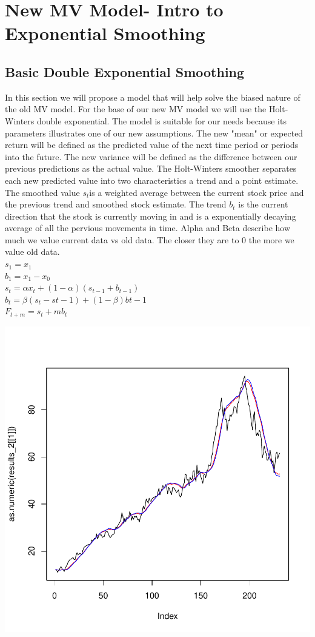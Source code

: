 \documentclass[english]{report}
\begin{document}
\newpage
\section{New MV Model- Intro to Exponential Smoothing}

\subsection{Basic Double Exponential Smoothing}

\Large{In this section we will propose a model that will help solve the biased nature of the old MV model. For the base of our new MV model we will use the Holt-Winters double exponential. The model is suitable for our needs because its parameters illustrates one of our new assumptions. The new "mean" or expected return will be defined as the predicted value of the next time period or periods into the future. The new variance will be defined as the difference between our previous predictions as the actual value. The Holt-Winters smoother separates each new predicted value into two characteristics a trend and a point estimate. The smoothed value \( s_t \)is a weighted average between the current stock price and the previous trend and smoothed stock estimate. The trend \( b_t \) is the current direction that the stock is currently moving in and is a exponentially decaying average of all the pervious movements in time. Alpha and Beta describe how much we value current data vs old data. The closer they are to 0 the more we value old data.}\\

\noindent
\Large{
\( s_1 = x_1 \)\\
\( b_1 = x_1 - x_0 \) \\
\( s_t = \alpha x_t + (1-\alpha )(s_{t-1} + b_{t-1}) \) \\
\( b_t = \beta(s_t - s{t-1}) + (1-\beta)b{t-1} \) \\
\( F_{t+m} = s_t + mb_t \)
}

\includegraphics{MV_report-002}
\end{document}
